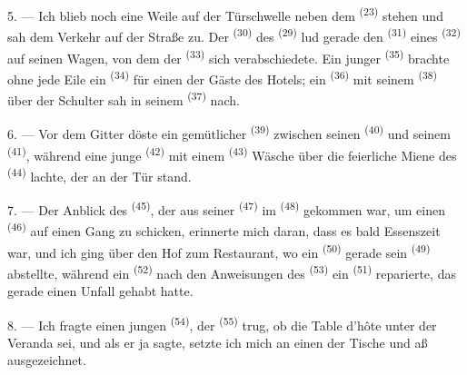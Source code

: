5. --- Ich blieb noch eine Weile auf der Türschwelle neben dem 
\textsuperscript{(23)} stehen und sah dem Verkehr auf der Straße zu. Der
 \textsuperscript{(30)} des 
\textsuperscript{(29)} lud gerade den  \textsuperscript{(31)} eines
 \textsuperscript{(32)} auf seinen Wagen, von dem der
 \textsuperscript{(33)} sich verabschiedete. Ein junger
 \textsuperscript{(35)} brachte ohne jede Eile ein
 \textsuperscript{(34)} für einen der Gäste des Hotels; ein
 \textsuperscript{(36)} mit seinem 
\textsuperscript{(38)} über der Schulter sah in seinem 
\textsuperscript{(37)} nach.

\VUsaut{4.0mm}
\VUsaut{3.0mm}

6. --- Vor dem Gitter döste ein gemütlicher 
\textsuperscript{(39)} zwischen seinen  \textsuperscript{(40)} und
seinem  \textsuperscript{(41)}, während eine junge
 \textsuperscript{(42)} mit einem 
\textsuperscript{(43)} Wäsche über die feierliche Miene des 
\textsuperscript{(44)} lachte, der an der Tür stand.

7. --- Der Anblick des  \textsuperscript{(45)}, der aus seiner
 \textsuperscript{(47)} im  \textsuperscript{(48)}
gekommen war, um einen  \textsuperscript{(46)} auf einen Gang zu
schicken, erinnerte mich daran, dass es bald Essenszeit war, und ich ging über den
Hof zum Restaurant, wo ein  \textsuperscript{(50)} gerade sein
 \textsuperscript{(49)} abstellte, während ein 
\textsuperscript{(52)} nach den Anweisungen des 
\textsuperscript{(53)} ein  \textsuperscript{(51)} reparierte,
das gerade einen Unfall gehabt hatte.

8. --- Ich fragte einen jungen  \textsuperscript{(54)}, der
 \textsuperscript{(55)} trug, ob die Table d'hôte unter der
Veranda sei, und als er ja sagte, setzte ich mich an einen der Tische und aß
ausgezeichnet.


